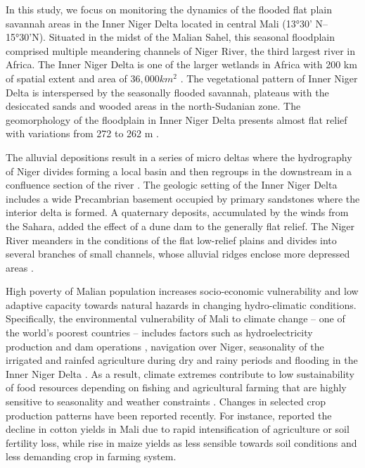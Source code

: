 \documentclass[12pt,a4paper,oneside]{article}
\def \newpar{\vspace{6pt}}
\begin{document}
\newpar In this study, we focus on monitoring the dynamics of the flooded flat plain savannah areas in the Inner Niger Delta located in central Mali (13°30' N--15°30'N). Situated in the midst of the Malian Sahel, this seasonal floodplain comprised multiple meandering channels of Niger River, the third largest river in Africa. The Inner Niger Delta is one of the larger wetlands in Africa with 200 km of spatial extent and area of $36,000 km^2$ \citep{KUPER200383}. The vegetational pattern of Inner Niger Delta is interspersed by the seasonally flooded savannah, plateaus with the desiccated sands and wooded areas in the north-Sudanian zone. The geomorphology of the floodplain in Inner Niger Delta presents almost flat relief with variations from 272 to 262 m \citep{Gallais2003}. 

\newpar The alluvial depositions result in a series of micro deltas where the hydrography of Niger divides forming a local basin and then regroups in the downstream in a confluence section of the river \citep{dickens2018flows}. The geologic setting of the Inner Niger Delta includes a wide Precambrian basement occupied by primary sandstones where the interior delta is formed. A quaternary deposits, accumulated by the winds from the Sahara, added the effect of a dune dam to the generally flat relief. The Niger River meanders in the conditions of the flat low-relief plains and divides into several branches of small channels, whose alluvial ridges enclose more depressed areas \citep{Gourou}.

\newpar High poverty of Malian population increases socio-economic vulnerability and low adaptive capacity towards natural hazards in changing hydro-climatic conditions. Specifically, the environmental vulnerability of Mali to climate change -- one of the world’s poorest countries -- includes factors such as hydroelectricity production and dam operations \citep{w11091766}, navigation over Niger, seasonality of the irrigated and rainfed agriculture during dry and rainy periods and flooding in the Inner Niger Delta \citep{Ghile}. As a result, climate extremes contribute to low sustainability of food resources depending on fishing and agricultural farming that are highly sensitive to seasonality and weather constraints \citep{Morand,LIERSCH2019176}. Changes in selected crop production patterns have been reported recently. For instance, \cite{LARIS20151} reported the decline in cotton yields in Mali due to rapid intensification of agriculture or soil fertility loss, while rise in maize yields as less sensible towards soil conditions and less demanding crop in farming system.
\end{document}
